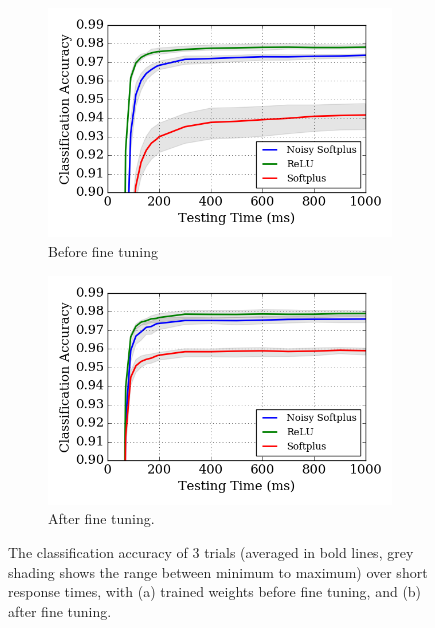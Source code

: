	\begin{figure}[htb!]
		\centering
		\begin{subfigure}[t]{0.49\textwidth}
			\DIFdelbeginFL %
\DIFdelendFL \DIFaddbeginFL \includegraphics[width=\textwidth]{pics_iconip/revise_8-2.png}
			\DIFaddendFL \caption{Before fine tuning}
		\end{subfigure}
		\begin{subfigure}[t]{0.49\textwidth}
			\DIFdelbeginFL %
\DIFdelendFL \DIFaddbeginFL \includegraphics[width=\textwidth]{pics_iconip/revise_8-3.png}
			\DIFaddendFL \caption{After fine tuning.}
		\end{subfigure}

		\caption[The classification accuracy after fine tuning.]{The classification accuracy of 3 trials (averaged in bold lines, grey shading shows the range between minimum to maximum) over short response times, with (a) trained weights before fine tuning, and (b) after fine tuning.}
		\label{fig:ca_time}	
	\end{figure}

